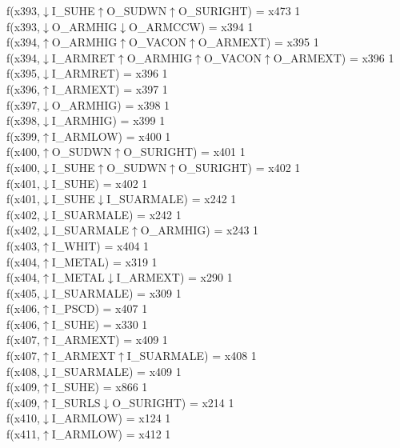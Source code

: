 f(x393,$\downarrow$I\_SUHE$\uparrow$O\_SUDWN$\uparrow$O\_SURIGHT) = x473 {1} \\
f(x393,$\downarrow$O\_ARMHIG$\downarrow$O\_ARMCCW) = x394 {1} \\
f(x394,$\uparrow$O\_ARMHIG$\uparrow$O\_VACON$\uparrow$O\_ARMEXT) = x395 {1} \\
f(x394,$\downarrow$I\_ARMRET$\uparrow$O\_ARMHIG$\uparrow$O\_VACON$\uparrow$O\_ARMEXT) = x396 {1} \\
f(x395,$\downarrow$I\_ARMRET) = x396 {1} \\
f(x396,$\uparrow$I\_ARMEXT) = x397 {1} \\
f(x397,$\downarrow$O\_ARMHIG) = x398 {1} \\
f(x398,$\downarrow$I\_ARMHIG) = x399 {1} \\
f(x399,$\uparrow$I\_ARMLOW) = x400 {1} \\
f(x400,$\uparrow$O\_SUDWN$\uparrow$O\_SURIGHT) = x401 {1} \\
f(x400,$\downarrow$I\_SUHE$\uparrow$O\_SUDWN$\uparrow$O\_SURIGHT) = x402 {1} \\
f(x401,$\downarrow$I\_SUHE) = x402 {1} \\
f(x401,$\downarrow$I\_SUHE$\downarrow$I\_SUARMALE) = x242 {1} \\
f(x402,$\downarrow$I\_SUARMALE) = x242 {1} \\
f(x402,$\downarrow$I\_SUARMALE$\uparrow$O\_ARMHIG) = x243 {1} \\
f(x403,$\uparrow$I\_WHIT) = x404 {1} \\
f(x404,$\uparrow$I\_METAL) = x319 {1} \\
f(x404,$\uparrow$I\_METAL$\downarrow$I\_ARMEXT) = x290 {1} \\
f(x405,$\downarrow$I\_SUARMALE) = x309 {1} \\
f(x406,$\uparrow$I\_PSCD) = x407 {1} \\
f(x406,$\uparrow$I\_SUHE) = x330 {1} \\
f(x407,$\uparrow$I\_ARMEXT) = x409 {1} \\
f(x407,$\uparrow$I\_ARMEXT$\uparrow$I\_SUARMALE) = x408 {1} \\
f(x408,$\downarrow$I\_SUARMALE) = x409 {1} \\
f(x409,$\uparrow$I\_SUHE) = x866 {1} \\
f(x409,$\uparrow$I\_SURLS$\downarrow$O\_SURIGHT) = x214 {1} \\
f(x410,$\downarrow$I\_ARMLOW) = x124 {1} \\
f(x411,$\uparrow$I\_ARMLOW) = x412 {1} \\
